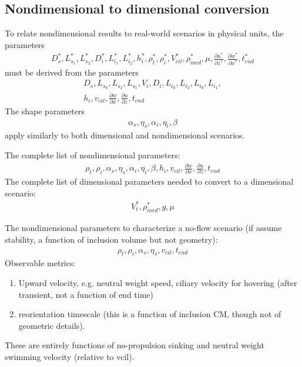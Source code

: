 \documentclass[10pt,a4paper]{article}
\def\non{\nonumber}
\def\p{\partial}
\begin{document}
\subsection{Nondimensional to dimensional conversion}
To relate nondimensional results to real-world scenarios in physical units, the parameters
\begin{eqnarray}\label{nd2dpars0}
	D^*_s, L^*_{s_1}, L^*_{s_2}, D^*_{i}, L^*_{i_1}, L^*_{i_2}, h^*_i, \rho^*_t, \rho^*_{i}, V^*_{cil}, \rho^*_{med}, \mu, \frac{\p u^*}{\p z^*}, \frac{\p w^*}{\p x^*}, t^*_{end}
\end{eqnarray}
must be derived from the parameters 
\begin{eqnarray}\label{nd2dpars1}
	D_s, L_{s_0}, L_{s_2}, L_{s_1}, V_i, D_i, L_{i_0}, L_{i_2}, L_{i_0}, L_{i_1}, \non \\
	h_i, v_{cil}, \frac{\p w}{\p x}, \frac{\p u}{\p z}, t_{end}
\end{eqnarray}
The shape parameters
\begin{eqnarray}\label{nd2dpars2}
	\alpha_s, \eta_s, \alpha_{i}, \eta_{i}, \beta
\end{eqnarray}
apply similarly to both dimensional and nondimensional scenarios.


\vspace{2cm}
The complete list of nondimensional parameters:
\begin{eqnarray}\label{nd2dpars_essential}
	\rho_t, \rho_i, \alpha_s, \eta_s, \alpha_{i}, \eta_{i}, \beta, h_i, v_{cil}, \frac{\p w}{\p x}, \frac{\p u}{\p z}, t_{end}
\end{eqnarray}
\vspace{2cm}
The complete list of dimensional parameters needed to convert to a dimensional scenario:
\begin{eqnarray}\label{nd2dpars_essential2}
	V_t^*, \rho^*_{med}, g, \mu
\end{eqnarray}

\vspace{2cm}
The nondimensional parameters to characterize a no-flow scenario (if assume stability, a function of inclusion volume but not geometry):
\begin{eqnarray}\label{nd2dpars_essential3}
	\rho_t, \rho_i, \alpha_s, \eta_s, v_{cil}, t_{end}
\end{eqnarray}
Observable metrics:
\begin{enumerate}
	\item Upward velocity, e.g. neutral weight speed, ciliary velocity for hovering (after transient, not a function of end time)
	\item reorientation timescale (this is a function of inclusion CM, though not of geometric details).
\end{enumerate}
These are entirely functions of no-propulsion sinking and neutral weight swimming velocity (relative to vcil).
\end{document}
